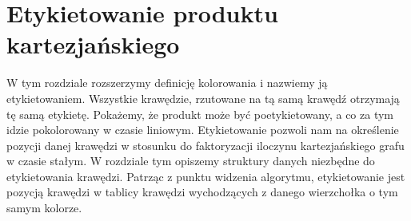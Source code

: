 \documentclass[12pt,a4paper,titlepage]{article}
\begin{document}
\section{Etykietowanie produktu kartezjańskiego}
W tym rozdziale rozszerzymy definicję kolorowania i nazwiemy ją etykietowaniem. Wszystkie krawędzie, rzutowane na tą samą krawędź otrzymają tę samą etykietę. Pokażemy, że produkt może być poetykietowany, a co za tym idzie pokolorowany w czasie liniowym. Etykietowanie pozwoli nam na określenie pozycji danej krawędzi w stosunku do faktoryzacji iloczynu kartezjańskiego grafu w czasie stałym. W rozdziale tym opiszemy struktury danych niezbędne do etykietowania krawędzi. Patrząc z punktu widzenia algorytmu, etykietowanie jest pozycją krawędzi w tablicy krawędzi wychodzących z danego wierzchołka o tym samym kolorze. \\
\end{document}

